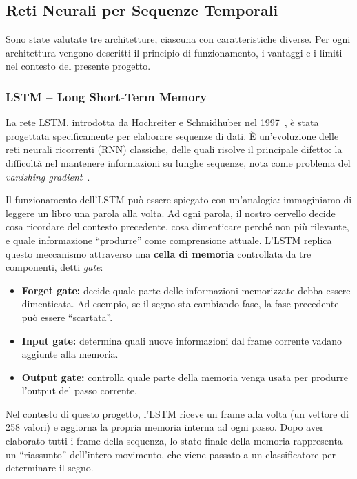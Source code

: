 \subsection{Reti Neurali per Sequenze Temporali}

Sono state valutate tre architetture, ciascuna con caratteristiche diverse. Per ogni architettura vengono descritti il principio di funzionamento, i vantaggi e i limiti nel contesto del presente progetto.

\subsubsection{LSTM -- Long Short-Term Memory}

La rete LSTM, introdotta da Hochreiter e Schmidhuber nel 1997~\cite{hochreiter1997lstm}, è stata progettata specificamente per elaborare sequenze di dati. È un'evoluzione delle reti neurali ricorrenti (RNN) classiche, delle quali risolve il principale difetto: la difficoltà nel mantenere informazioni su lunghe sequenze, nota come problema del \textit{vanishing gradient}~\cite{lecun2015deeplearning}.

Il funzionamento dell'LSTM può essere spiegato con un'analogia: immaginiamo di leggere un libro una parola alla volta. Ad ogni parola, il nostro cervello decide cosa ricordare del contesto precedente, cosa dimenticare perché non più rilevante, e quale informazione ``produrre'' come comprensione attuale. L'LSTM replica questo meccanismo attraverso una \textbf{cella di memoria} controllata da tre componenti, detti \textit{gate}:

\begin{itemize}
    \item \textbf{Forget gate:} decide quale parte delle informazioni memorizzate debba essere dimenticata. Ad esempio, se il segno sta cambiando fase, la fase precedente può essere ``scartata''.
    \item \textbf{Input gate:} determina quali nuove informazioni dal frame corrente vadano aggiunte alla memoria.
    \item \textbf{Output gate:} controlla quale parte della memoria venga usata per produrre l'output del passo corrente.
\end{itemize}

Nel contesto di questo progetto, l'LSTM riceve un frame alla volta (un vettore di 258 valori) e aggiorna la propria memoria interna ad ogni passo. Dopo aver elaborato tutti i frame della sequenza, lo stato finale della memoria rappresenta un ``riassunto'' dell'intero movimento, che viene passato a un classificatore per determinare il segno.

